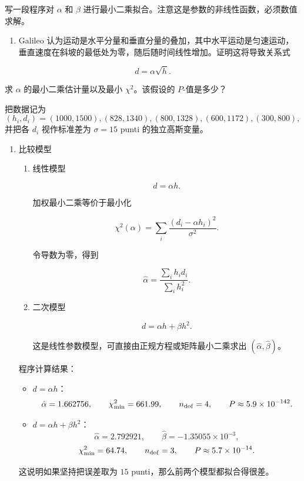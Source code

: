 \begin{question}
写一段程序对 \(\alpha\) 和 \(\beta\)
进行最小二乘拟合。注意这是参数的非线性函数，必须数值求解。

\begin{enumerate}[start=3]
\item
  Galileo
  认为运动是水平分量和垂直分量的叠加，其中水平运动是匀速运动，垂直速度在斜坡的最低处为零，随后随时间线性增加。证明这将导致关系式
\end{enumerate}

\[
d=\alpha\sqrt{h}.
\]

求 \(\alpha\) 的最小二乘估计量以及最小 \(\chi^2\)。该假设的
\(P\)-值是多少？
\begin{solution}
把数据记为
\[
(h_i,d_i)=(1000,1500),(828,1340),(800,1328),(600,1172),(300,800),
\]
并把各 \(d_i\) 视作标准差为 \(\sigma=15\) punti 的独立高斯变量。

\begin{enumerate}
\item 比较模型

\begin{enumerate}
\item
  线性模型

  \[
  d=\alpha h.
  \]

  加权最小二乘等价于最小化

  \[
  \chi^2(\alpha)=\sum_i\frac{(d_i-\alpha h_i)^2}{\sigma^2}.
  \]

  令导数为零，得到

  \[
  \hat\alpha=\frac{\sum_i h_i d_i}{\sum_i h_i^2}.
  \]
\item
  二次模型

  \[
  d=\alpha h+\beta h^2.
  \]

  这是线性参数模型，可直接由正规方程或矩阵最小二乘求出
  \((\hat\alpha,\hat\beta)\)。
\end{enumerate}

程序计算结果：

\begin{itemize}
\item
  \(d=\alpha h\)： \[
  \hat\alpha=1.662756,
  \qquad
  \chi^2_{\min}=661.99,
  \qquad
  n_{\rm dof}=4,
  \qquad
  P\approx5.9\times10^{-142}.
  \]
\item
  \(d=\alpha h+\beta h^2\)： \[
  \hat\alpha=2.792921,
  \qquad
  \hat\beta=-1.35055\times10^{-3},
  \] \[
  \chi^2_{\min}=64.74,
  \qquad
  n_{\rm dof}=3,
  \qquad
  P\approx5.7\times10^{-14}.
  \]
\end{itemize}

这说明如果坚持把误差取为 \(15\) punti，那么前两个模型都拟合得很差。


\end{enumerate}
\end{solution}
\end{question}
